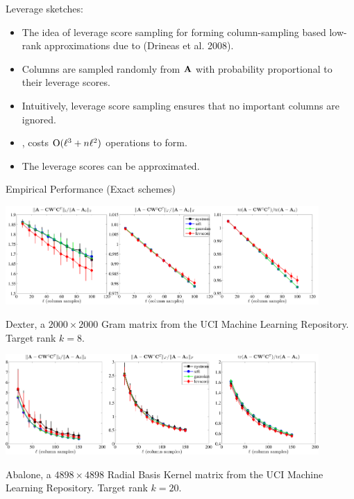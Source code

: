 \documentclass[xcolor=x11names,compress,ignorenonframetext,10pt]{beamer}
\renewcommand{\(}{\begin{columns}}
\renewcommand{\)}{\end{columns}}
\newcommand{\<}[1]{\begin{column}{#1}}
\renewcommand{\>}{\end{column}}
\def\refcolor{DodgerBlue4}
\newcommand{\refer}[1]{({\color{\refcolor}#1})}
\begin{document}
\begin{frame}

Leverage sketches:
 \begin{itemize}
 \item The idea of leverage score sampling for forming column-sampling based low-rank approximations due to \refer{Drineas et al. 2008}.
  \item Columns are sampled randomly from $\mathbf{A}$ with probability proportional to their leverage scores.
  \item Intuitively, leverage score sampling ensures that no important columns are ignored.
  \item {\color{red}{Assuming the leverage scores as given}}, costs $\mathrm{O}(\ell^3 + n \ell^2)$ operations to form.
  \item The leverage scores can be approximated.
 \end{itemize}

\end{frame}

\begin{frame}{Empirical Performance (Exact schemes)}

  \centerline{\includegraphics[width=4.7in, keepaspectratio=true]{figures/spsd/Dexterrank8exact-methods-nonfixed-rank-errors-range}}

 Dexter, a $2000 \times 2000$ Gram matrix from the UCI Machine Learning Repository. 
 Target rank $k= 8.$
\end{frame}

\begin{frame}

  \centerline{\includegraphics[width=4.7in, keepaspectratio=true]{figures/spsd/Abalonesigma1exact-methods-nonfixed-rank-errors-range}}

 Abalone, a $4898 \times 4898$ Radial Basis Kernel matrix from the UCI Machine Learning Repository. 
 Target rank $k= 20.$ 
\end{frame}
\end{document}
